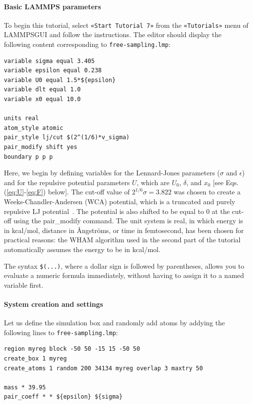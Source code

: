 \documentclass[9pt,tutorial]{livecoms}
\newcommand{\lmpcmd}[1]{\colorbox{listing}{\textcolor{command}{\small{#1}}}} %
\newcommand{\flecmd}[1]{\textcolor{command}{\texttt{#1}}} %
\newcommand{\guicmd}[1]{\textcolor{command}{\texttt{«#1»}}} %
\newcommand{\lammpsgui}{\textsf{LAMMPS\textendash GUI}}
\begin{document}
\paragraph{Basic LAMMPS parameters}

To begin this tutorial, select \guicmd{Start Tutorial 7} from the
\guicmd{Tutorials} menu of \lammpsgui{} and follow the instructions.
The editor should display the following content corresponding to \flecmd{free-sampling.lmp}:
\begin{lstlisting}
variable sigma equal 3.405
variable epsilon equal 0.238
variable U0 equal 1.5*${epsilon}
variable dlt equal 1.0
variable x0 equal 10.0

units real
atom_style atomic
pair_style lj/cut $(2^(1/6)*v_sigma)
pair_modify shift yes
boundary p p p
\end{lstlisting}
Here, we begin by defining variables for the Lennard-Jones parameters
($\sigma$ and $\epsilon$) and for the repulsive potential parameters
$U$, which are $U_0$, $\delta$, and
$x_0$ [see Eqs.\,(\ref{eq:U}-\ref{eq:F}) below].  The cut-off value of
$ 2^{1/6} \sigma = 3.822$ was chosen to create a Weeks-Chandler-Andersen (WCA) potential,
which is a truncated and purely repulsive LJ potential~\cite{weeks1971role}.
The potential is also shifted to be equal to 0 at the cut-off
using the \lmpcmd{pair\_modify} command.  The unit system is
\lmpcmd{real}, in which energy is in kcal/mol, distance in Ångströms, or
time in femtosecond, has been chosen for practical reasons: the WHAM
algorithm used in the second part of the tutorial automatically assumes
the energy to be in kcal/mol.

\begin{note}
  The syntax \texttt{\$(...)}, where a dollar sign is followed by parentheses, allows
  you to evaluate a numeric formula immediately, without having to assign it
  to a named variable first.
\end{note}

\paragraph{System creation and settings}

Let us define the simulation box and randomly add atoms by addying the
following lines to \flecmd{free-sampling.lmp}:
\begin{lstlisting}
region myreg block -50 50 -15 15 -50 50
create_box 1 myreg
create_atoms 1 random 200 34134 myreg overlap 3 maxtry 50

mass * 39.95
pair_coeff * * ${epsilon} ${sigma}
\end{lstlisting}
\end{document}
